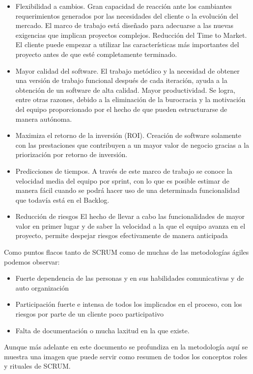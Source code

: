 \documentclass[../pfc.tex]{subfiles}
\begin{document}
	\begin{itemize} 
		\item Flexibilidad a cambios. Gran capacidad de reacción ante los cambiantes requerimientos generados por las necesidades del cliente o la evolución del mercado. El marco de trabajo está diseñado para adecuarse a las nuevas exigencias que implican proyectos complejos.
		Reducción del Time to Market. El cliente puede empezar a utilizar las características más importantes del proyecto antes de que esté completamente terminado. 
		\item Mayor calidad del software. El trabajo metódico y la necesidad de obtener una versión de trabajo funcional después de cada iteración, ayuda a la obtención de un software de alta calidad.
		Mayor productividad. Se logra, entre otras razones, debido a la eliminación de la burocracia y la motivación del equipo proporcionado por el hecho de que pueden estructurarse de manera autónoma.
		\item Maximiza el retorno de la inversión (ROI). Creación de software solamente con las prestaciones que contribuyen a un mayor valor de negocio gracias a la priorización por retorno de inversión.
		\item Predicciones de tiempos. A través de este marco de trabajo se conoce la velocidad media del equipo por sprint, con lo que es posible estimar de manera fácil cuando se podrá hacer uso de una determinada funcionalidad que todavía está en el Backlog.
		\item Reducción de riesgos El hecho de llevar a cabo las funcionalidades de mayor valor en primer lugar y de saber la velocidad a la que el equipo avanza en el proyecto, permite despejar riesgos efectivamente de manera anticipada
	\end{itemize}
	
	Como puntos flacos tanto de SCRUM como de muchas de las metodologías ágiles podemos observar:
	
		\begin{itemize} 
			\item Fuerte dependencia de las personas y en sus habilidades comunicativas y de auto organización
			\item Participación fuerte e intensa de todos los implicados en el proceso, con los riesgos por parte de un cliente poco participativo
			\item Falta de documentación o mucha laxitud en la que existe.
		\end{itemize}
	
	Aunque más adelante en este documento se profundiza en la metodología aquí se muestra una imagen que puede servir como resumen de todos los conceptos roles y rituales de SCRUM.
	
\end{document}
